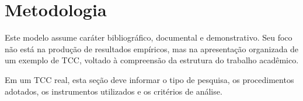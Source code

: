 
\chapter{Metodologia}

Este modelo assume caráter bibliográfico, documental e demonstrativo. Seu foco não está na produção de resultados empíricos, mas na apresentação organizada de um exemplo de TCC, voltado à compreensão da estrutura do trabalho acadêmico.

Em um TCC real, esta seção deve informar o tipo de pesquisa, os procedimentos adotados, os instrumentos utilizados e os critérios de análise.
